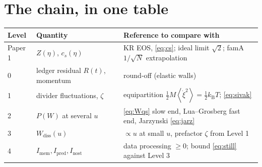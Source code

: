 \documentclass[11pt,a4paper]{article}
\newcommand{\kT}{k_{\mathrm B}T}
\newcommand{\avg}[1]{\left\langle #1 \right\rangle}
\begin{document}
\section{The chain, in one table}
\begin{center}
\small
\begin{tabular}{@{}lll@{}}
\toprule
Level & Quantity & Reference to compare with\\
\midrule
Paper 1 & $Z(\eta)$, $c_s(\eta)$ & KR EOS, \eqref{eq:cs}; ideal limit $\sqrt2$; famA $1/\sqrt N$ extrapolation\\
0 & ledger residual $R(t)$, momentum & round-off (elastic walls)\\
1 & divider fluctuations, $\zeta$ & equipartition $\tfrac12M\avg{\dot\xi^2} = \tfrac12\kT$; \eqref{eq:sivak}\\
2 & $P(W)$ at several $u$ & \eqref{eq:Wqs} slow end, Lua--Grosberg fast end, Jarzynski \eqref{eq:jarz}\\
3 & $W_{\mathrm{diss}}(u)$ & $\propto u$ at small $u$, prefactor $\zeta$ from Level 1\\
4 & $I_{\mathrm{mem}}, I_{\mathrm{pred}}, I_{\mathrm{nost}}$ & data processing $\ge0$; bound \eqref{eq:still} against Level 3\\
\bottomrule
\end{tabular}
\end{center}
\end{document}
